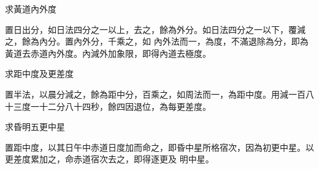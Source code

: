 \begin{pinyinscope}
 求黃道內外度



 置日出分，如日法四分之一以上，去之，餘為外分。如日法四分之一以下，覆減之，餘為內分。置內外分，千乘之，如
 內外法而一，為度，不滿退除為分，即為黃道去赤道內外度。內減外加象限，即得內道去極度。



 求距中度及更差度



 置半法，以晨分減之，餘為距中分，百乘之，如周法而一，為距中度。用減一百八十三度一十二分八十四秒，餘四因退位，為每更差度。



 求昏明五更中星



 置距中度，以其日午中赤道日度加而命之，即昏中星所格宿次，因為初更中星。以更差度累加之，命赤道宿次去之，即得逐更及
 明中星。



\end{pinyinscope}